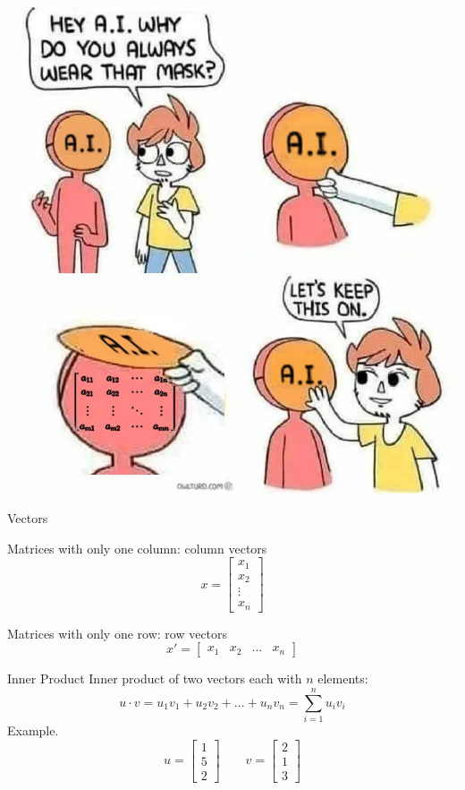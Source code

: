 \documentclass{./../../Latex/teaching_slides}
\begin{document}
\begin{frame}{}
\centering
\includegraphics[scale=0.3]{AI_linal.jpeg}
\end{frame}

\begin{frame}{Vectors}
\begin{witemize}
\item Matrices with only one column: column vectors 
$$ x =  \begin{bmatrix}
x_1\\
x_2 \\
\vdots \\
x_n
\end{bmatrix} $$
\item Matrices with only one row: row vectors
$$ x' =  \begin{bmatrix}
x_1 &
x_2 & \hdots &
x_n
\end{bmatrix} $$
\end{witemize}
\end{frame}

\begin{frame}{Inner Product}
Inner product of two vectors each with $n$ elements:
$$ u \cdot v = u_1 v_1 + u_2 v_2 +...+ u_n v_n = \sum_{i=1}^n u_i v_i $$ 
Example. $$u = \begin{bmatrix} 1 \\ 5 \\ 2 \end{bmatrix} \quad \quad v = \begin{bmatrix} 2 \\ 1 \\ 3 \end{bmatrix}$$
\end{frame}
\end{document}
